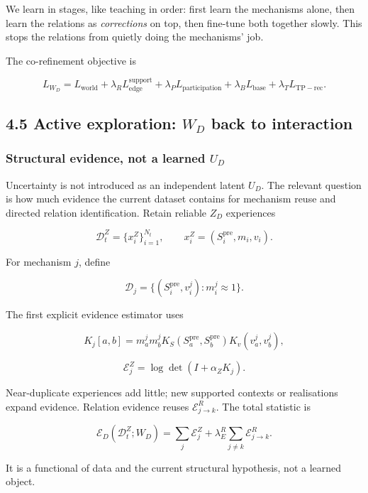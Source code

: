 \documentclass[11pt]{article}
\newenvironment{plainword}{%
  \par\medskip\noindent\begin{minipage}{\textwidth}%
  \color{gray!75!black}\small\itshape
}{%
  \end{minipage}\par\medskip}
\begin{document}
\begin{plainword}
We learn in stages, like teaching in order: first learn the mechanisms alone, then learn the relations as \emph{corrections} on top,
then fine-tune both together slowly. This stops the relations from quietly doing the mechanisms' job.
\end{plainword}

The co-refinement objective is

\[
\boxed{
L_{W_D}=L_{\mathrm{world}}
+\lambda_RL_{\mathrm{edge}}^{\mathrm{support}}
+\lambda_PL_{\mathrm{participation}}
+\lambda_BL_{\mathrm{base}}
+\lambda_TL_{\mathrm{TP-rec}}.}
\]

\subsection*{4.5 Active exploration: $W_D$ back to interaction}

\subsubsection*{Structural evidence, not a learned $U_D$}

Uncertainty is not introduced as an independent latent $U_D$. The relevant question is how much evidence the current dataset
contains for mechanism reuse and directed relation identification. Retain reliable $Z_D$ experiences

\[
\mathcal D_t^Z=\{x_i^Z\}_{i=1}^{N_t},
\qquad
x_i^Z=(S_i^{\mathrm{pre}},m_i,v_i).
\]

For mechanism $j$, define

\[
\mathcal D_j=\{(S_i^{\mathrm{pre}},v_i^j):m_i^j\approx1\}.
\]

The first explicit evidence estimator uses

\[
K_j[a,b]=m_a^jm_b^j
K_S(S_a^{\mathrm{pre}},S_b^{\mathrm{pre}})
K_v(v_a^j,v_b^j),
\]

\[
\boxed{\mathcal E_j^Z=\log\det(I+\alpha_ZK_j).}
\]

Near-duplicate experiences add little; new supported contexts or realisations expand evidence. Relation evidence reuses
$\mathcal E_{j\rightarrow k}^R$. The total statistic is

\[
\boxed{
\mathcal E_D(\mathcal D_t^Z;W_D)=
\sum_j\mathcal E_j^Z+
\lambda_E^R\sum_{j\neq k}\mathcal E_{j\rightarrow k}^R.}
\]

It is a functional of data and the current structural hypothesis, not a learned object.
\end{document}
